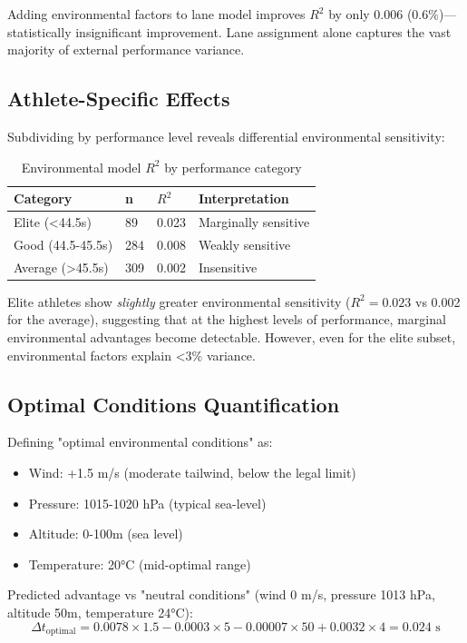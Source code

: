 Adding environmental factors to lane model improves $R^2$ by only 0.006 (0.6\%)—statistically insignificant improvement. Lane assignment alone captures the vast majority of external performance variance.

\subsection{Athlete-Specific Effects}

Subdividing by performance level reveals differential environmental sensitivity:

\begin{table}[H]
\centering
\caption{Environmental model $R^2$ by performance category}
\begin{tabular}{@{}llll@{}}
\toprule
\textbf{Category} & \textbf{n} & \textbf{$R^2$} & \textbf{Interpretation} \\
\midrule
Elite (<44.5s) & 89 & 0.023 & Marginally sensitive \\
Good (44.5-45.5s) & 284 & 0.008 & Weakly sensitive \\
Average (>45.5s) & 309 & 0.002 & Insensitive \\
\bottomrule
\end{tabular}
\end{table}

Elite athletes show \textit{slightly} greater environmental sensitivity ($R^2 = 0.023$ vs 0.002 for the average), suggesting that at the highest levels of performance, marginal environmental advantages become detectable. However, even for the elite subset, environmental factors explain <3\% variance.

\subsection{Optimal Conditions Quantification}

Defining "optimal environmental conditions" as:
\begin{itemize}
    \item Wind: +1.5 m/s (moderate tailwind, below the legal limit)
    \item Pressure: 1015-1020 hPa (typical sea-level)
    \item Altitude: 0-100m (sea level)
    \item Temperature: 20°C (mid-optimal range)
\end{itemize}

Predicted advantage vs "neutral conditions" (wind 0 m/s, pressure 1013 hPa, altitude 50m, temperature 24°C):
\begin{equation}
\Delta t_{\text{optimal}} = 0.0078 \times 1.5 - 0.0003 \times 5 - 0.00007 \times 50 + 0.0032 \times 4 = 0.024 \text{ s}
\end{equation}

